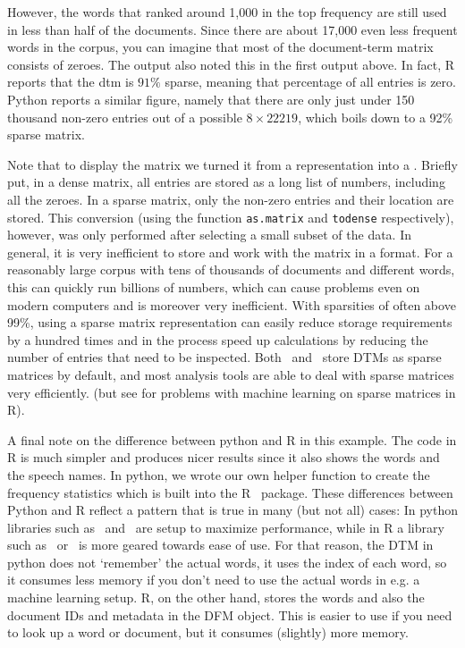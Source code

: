However, the words that ranked around 1,000 in the top frequency are still used in less than half of the documents.
Since there are about 17,000 even less frequent words in the corpus, you can imagine that most of the document-term matrix consists of zeroes. 
The output also noted this  in the first output above.
In fact, R reports that the dtm is $91\%$ sparse, meaning that percentage of all entries is zero.
Python reports a similar figure, namely that there are only just under 150 thousand non-zero entries
out of a possible $8\times22219$, which boils down to a 92\% sparse matrix.

Note that to display the matrix we turned it from a  representation into a .
Briefly put, in a dense matrix, all entries are stored as a long list of numbers, including all the zeroes.
In a sparse matrix,  only the non-zero entries and their location are stored. 
This conversion (using the function \verb|as.matrix| and \verb|todense| respectively), however, was only performed after selecting a small subset of the data.
In general,  it is very inefficient to store and work with the matrix in a  format.
For a reasonably large corpus with tens of thousands of documents and different words, this can quickly run billions of numbers,
which can cause problems even on modern computers and is moreover very inefficient.
With sparsities of often above 99\%, using a sparse matrix representation can easily reduce storage requirements by a hundred times and in the process speed up calculations by reducing the number of entries that need to be inspected.
Both \quanteda\ and \sklearn\ store DTMs as sparse matrices by default,
and most analysis tools are able to deal with sparse matrices very efficiently.
(but see  for problems with machine learning on sparse matrices in R). 

A final note on the difference between python and R in this example.
The code in R is much simpler and produces nicer results since it also shows the words and the speech names.
In python, we wrote our own helper function to create the frequency statistics which is built into the R \quanteda\ package.
These differences between Python and R reflect a pattern that is true in many (but not all) cases:
In python libraries such as \numpy\ and \sklearn\ are setup to maximize performance,
while in R a library such as \quanteda\ or \tidyverse\ is more geared towards ease of use.
For that reason, the DTM in python does not `remember' the actual words, it uses the index of each word,
so it consumes less memory if you don't need to use the actual words in e.g. a machine learning setup.
R, on the other hand, stores the words and also the document IDs and metadata in the DFM object.
This is easier to use if you need to look up a word or document, but it consumes (slightly) more memory. 


